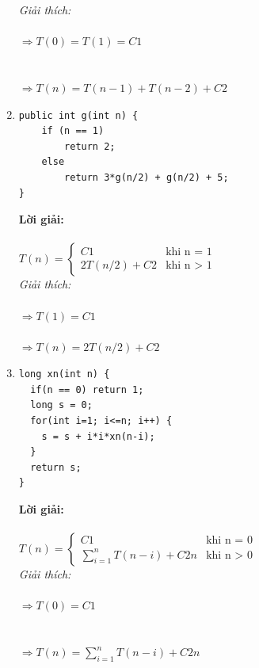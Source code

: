 \documentclass[12pt, letterpaper]{article}
\begin{document}
\begin{enumerate}
    \textit{Giải thích:} \\
     \\
    $\Rightarrow T(0) = T(1) = C1$ \\
     \\
     \\ 
    $\Rightarrow T(n) = T(n-1) + T(n-2) + C2$ \\

	\item \begin{lstlisting}
public int g(int n) {
    if (n == 1)
        return 2;
    else
        return 3*g(n/2) + g(n/2) + 5;
}
    \end{lstlisting}
    \textbf{Lời giải:} \\ \\
    $T(n) =
    \begin{cases}
    C1 &\text{khi n = 1} \\
    2T(n/2) + C2 &\text{khi n > 1}
    \end{cases}$ \\

    \textit{Giải thích:} \\
     \\
    $\Rightarrow T(1) = C1$ \\
     \\ 
    $\Rightarrow T(n) = 2T(n/2) + C2$ \\

	\item \begin{lstlisting}
long xn(int n) {
  if(n == 0) return 1;
  long s = 0;
  for(int i=1; i<=n; i++) {
    s = s + i*i*xn(n-i);
  }
  return s;
}
	\end{lstlisting}
  \textbf{Lời giải:} \\ \\
  $T(n) =
  \begin{cases}
  C1 &\text{khi n = 0} \\
  \sum_{i=1}^{n} T(n-i) + C2n &\text{khi n > 0}
  \end{cases}$ \\

  \textit{Giải thích:} \\
   \\
  $\Rightarrow T(0) = C1$ \\
   \\
   \\
  $\Rightarrow T(n) = \sum_{i=1}^{n} T(n-i) + C2n$ \\



\end{enumerate}
\end{document}
